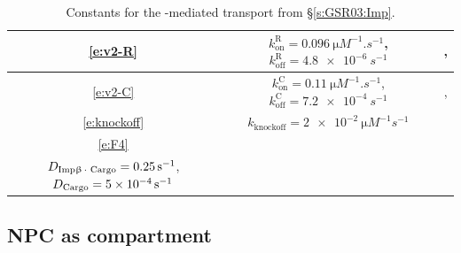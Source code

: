 \documentclass[12pt,notitlepage]{article}
\begin{document}
\begin{table}
\centering
\small
\begin{tabular}{c|c|c}
	\hline
	\eqref{e:v2-R}
	&
	$k_\text{on}^\text{R} = \SI{0.096}{\micro M^{-1} . s^{-1}}$,
	\;
	$k_\text{off}^\text{R} = \SI{4.8e-6}{s^{-1}}$
	&
	\cite[Supp.~Table~A]{GoerlichSeewaldRibbeck2003},
	\cite[Table II]{RiddickMacara2005}
	\\
	\hline
	\eqref{e:v2-C}
	&
	$k_\text{on}^\text{C} = \SI{0.11}{\micro M^{-1} . s^{-1}}$,
	\quad
	$k_\text{off}^\text{C} = \SI{7.2e-4}{s^{-1}}$
	&
	\cite[Table~I]{Catimel2001},
	\cite[Table~II]{RiddickMacara2005}
	\\
	\hline
	\eqref{e:knockoff}
	&
	$k_\text{knockoff} = \SI{2e-2}{\micro M^{-1} s^{-1}}$
	&
	\cite[Table II]{RiddickMacara2005}
	\\
	\hline
	\eqref{e:F4}
	&
	\makecell{
		$D_{\ce{Imp\beta . Ran . GTP}} = \SI{0.07}{s^{-1}}$, \quad
		$D_{\ce{Imp\beta}} = \SI{0.4}{s^{-1}}$
		\\
		$D_{\ce{Imp\beta . Cargo}} = \SI{0.25}{s^{-1}}$, \;	
		$D_{\ce{Cargo}} = \SI{5e-4}{s^{-1}}$
	}
	&
	\cite[Table III]{RiddickMacara2005}
	\\
	\hline
\end{tabular}
%
\caption{%
	Constants for the -mediated
	transport from \S\ref{s:GSR03:Imp}.
}
%
\label{t:GSR-ImpB-const}
\end{table}










\subsection{NPC as compartment} \label{s:GSR03-redux}
\end{document}
